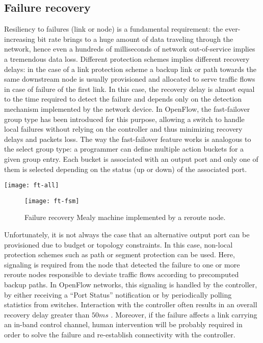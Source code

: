 \documentclass[10pt,conference]{IEEEtran}
\begin{document}
\subsection{Failure recovery}
\label{sec:ft}

Resiliency to failures (link or node) is a fundamental requirement: the ever-increasing bit rate brings to a huge amount of data traveling through the network, hence even a hundreds of milliseconds of network out-of-service implies a tremendous data loss. Different protection schemes implies different recovery delays: in the case of a link protection scheme a backup link or path towards the same downstream node is usually provisioned and allocated to serve traffic flows in case of failure of the first link. In this case, the recovery delay is almost equal to the time required to detect the failure and depends only on the detection mechanism implemented by the network device. In OpenFlow, the fast-failover group type has been introduced for this purpose, allowing a switch to handle local failures without relying on the controller and thus minimizing recovery delays and packets loss. The way the fast-failover feature works is analogous to the select group type: a programmer can define multiple action buckets for a given group entry. Each bucket is associated with an output port and only one of them is selected depending on the status (up or down) of the associated port.

\begin{figure*}
  \centering
  \texttt{[image: ft-all]}
  \caption{Failure recovery example with OpenState. The behavioral model of node 2 is shown in Fig.~\ref{fig:ft-fsm}.}
  \label{fig:ft-example}
\end{figure*}

\begin{figure}[b]
  \centering
  \texttt{[image: ft-fsm]}
  \caption{Failure recovery Mealy machine implemented by a reroute node.}
  \label{fig:ft-fsm}
\end{figure}

Unfortunately, it is not always the case that an alternative output port can be provisioned due to budget or topology constraints. In this case, non-local protection schemes such as path or segment protection can be used. Here, signaling is required from the node that detected the failure to one or more reroute nodes responsible to deviate traffic flows according to precomputed backup paths. In OpenFlow networks, this signaling is handled by the controller, by either receiving a ``Port Status'' notification or by periodically polling statistics from switches. Interaction with the controller often results in an overall recovery delay greater than $50ms$ \cite{staessens11}. Moreover, if the failure affects a link carrying an in-band control channel, human intervention will be probably required in order to solve the failure and re-establish connectivity with the controller.
\end{document}
